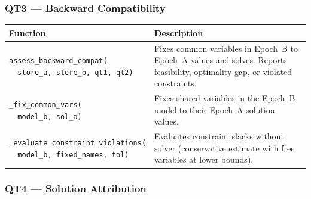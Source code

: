 \documentclass[11pt, a4paper]{article}
\begin{document}
\subsubsection{QT3 --- Backward Compatibility}

\begin{longtable}{p{5.5cm} p{9cm}}
\toprule
\textbf{Function} & \textbf{Description} \\
\midrule
\texttt{assess\_backward\_compat(\\ ~~store\_a, store\_b, qt1, qt2)} &
    Fixes common variables in Epoch~B to Epoch~A values and solves.
    Reports feasibility, optimality gap, or violated constraints. \\
\midrule
\texttt{\_fix\_common\_vars(\\ ~~model\_b, sol\_a)} &
    Fixes shared variables in the Epoch~B model to their Epoch~A
    solution values. \\
\midrule
\texttt{\_evaluate\_constraint\_violations(\\ ~~model\_b, fixed\_names, tol)} &
    Evaluates constraint slacks without solver (conservative estimate
    with free variables at lower bounds). \\
\bottomrule
\end{longtable}

\subsubsection{QT4 --- Solution Attribution}
\end{document}
